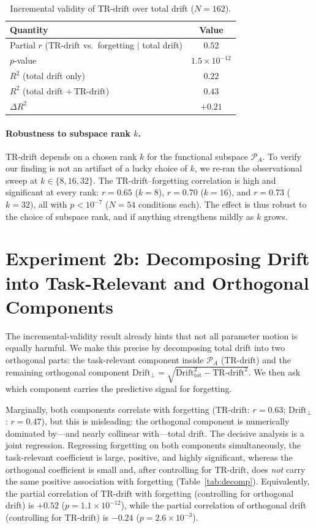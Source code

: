 \documentclass[11pt]{article}
\newcommand{\trdrift}{\mathrm{TR\text{-}drift}}
\newcommand{\totaldrift}{\mathrm{Drift}_{\mathrm{tot}}}
\newcommand{\PA}{\mathcal{P}_A}
\begin{document}
\begin{table}[t]
\centering
\caption{Incremental validity of $\trdrift$ over total drift ($N=162$).}
\label{tab:incremental}
\begin{tabular}{lc}
\toprule
Quantity & Value \\
\midrule
Partial $r$ ($\trdrift$ vs.\ forgetting $\mid$ total drift) & $0.52$ \\
\quad $p$-value & $1.5\times10^{-12}$ \\
$R^2$ (total drift only)              & $0.22$ \\
$R^2$ (total drift $+\,\trdrift$)     & $0.43$ \\
$\Delta R^2$                          & $+0.21$ \\
\bottomrule
\end{tabular}
\end{table}

\paragraph{Robustness to subspace rank $k$.}
TR-drift depends on a chosen rank $k$ for the functional subspace $\PA$. To
verify our finding is not an artifact of a lucky choice of $k$, we re-ran the
observational sweep at $k\in\{8,16,32\}$. The TR-drift--forgetting correlation is
high and significant at every rank: $r=0.65$ ($k=8$), $r=0.70$ ($k=16$), and
$r=0.73$ ($k=32$), all with $p<10^{-7}$ ($N=54$ conditions each). The effect is
thus robust to the choice of subspace rank, and if anything strengthens mildly
as $k$ grows.

\section{Experiment 2b: Decomposing Drift into Task-Relevant and Orthogonal Components}
\label{sec:decomposition}

The incremental-validity result already hints that not all parameter motion is
equally harmful. We make this precise by decomposing total drift into two
orthogonal parts: the task-relevant component inside $\PA$ ($\trdrift$) and the
remaining orthogonal component
$\mathrm{Drift}_{\perp}=\sqrt{\totaldrift^{2}-\trdrift^{2}}$. We then ask which
component carries the predictive signal for forgetting.

Marginally, both components correlate with forgetting ($\trdrift$: $r=0.63$;
$\mathrm{Drift}_{\perp}$: $r=0.47$), but this is misleading: the orthogonal
component is numerically dominated by---and nearly collinear with---total drift.
The decisive analysis is a joint regression. Regressing forgetting on both
components simultaneously, the task-relevant coefficient is large, positive, and
highly significant, whereas the orthogonal coefficient is small and, after
controlling for $\trdrift$, does \emph{not} carry the same positive association
with forgetting (Table~\ref{tab:decomp}). Equivalently, the partial correlation
of $\trdrift$ with forgetting (controlling for orthogonal drift) is $+0.52$
($p=1.1\times10^{-12}$), while the partial correlation of orthogonal drift
(controlling for $\trdrift$) is $-0.24$ ($p=2.6\times10^{-3}$).
\end{document}
